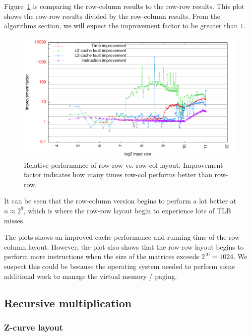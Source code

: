 Figure~\ref{fig:rowcol_vs_rowrow} is comparing the row-column results
to the row-row results. This plot shows the row-row results divided by
the row-column results. From the algorithms section, we will expect
the improvement factor to be greater than $1$.
\begin{figure}[h!]
  \centering
  \includegraphics[width=\textwidth]{plots/rowcol_vs_rowrow}
  \caption{Relative performance of row-row vs. row-col
    layout. Improvement factor indicates how many times row-col
    performs better than row-row.}
  \label{fig:rowcol_vs_rowrow}
\end{figure}

It can be seen that the row-column version begins to perform a lot
better at $n \approx 2^9$, which is where the row-row layout begin to
experience lots of TLB misses.

The plots shows an improved cache performance and running time of the
row-column layout. However, the plot also shows that the row-row
layout begins to perform more instructions when the size of the
matrices exceeds $2^{10} = 1024$. We suspect this could be because the
operating system needed to perform some additional work to manage the
virtual memory / paging.

\subsection{Recursive multiplication}

\subsubsection{Z-curve layout}



